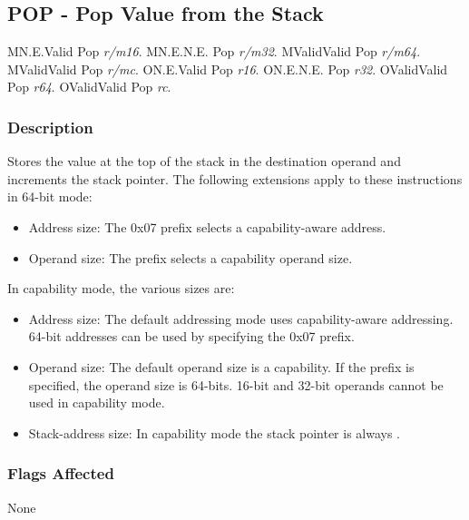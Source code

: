 \clearpage
{}
{}
\subsection*{POP - Pop Value from the Stack}

\begin{x86opcodetable}
  {M}{N.E.}{Valid}
  {Pop \emph{r/m16}.}
  {M}{N.E.}{N.E.}
  {Pop \emph{r/m32}.}
  {M}{Valid}{Valid}
  {Pop \emph{r/m64}.}
  {M}{Valid}{Valid}
  {Pop \emph{r/mc}.}
  {O}{N.E.}{Valid}
  {Pop \emph{r16}.}
  {O}{N.E.}{N.E.}
  {Pop \emph{r32}.}
  {O}{Valid}{Valid}
  {Pop \emph{r64}.}
  {O}{Valid}{Valid}
  {Pop \emph{rc}.}
\end{x86opcodetable}

\begin{x86opentable}
\end{x86opentable}

\subsubsection*{Description}

Stores the value at the top of the stack in the destination operand
and increments the stack pointer.  The following extensions apply to
these instructions in 64-bit mode:

\begin{itemize}
  \item Address size: The 0x07 prefix selects a capability-aware
    address.

  \item Operand size: The  prefix selects a capability
    operand size.
\end{itemize}

In capability mode, the various sizes are:

\begin{itemize}
  \item Address size: The default addressing mode uses
    capability-aware addressing.  64-bit addresses can be used by
    specifying the 0x07 prefix.

  \item Operand size: The default operand size is a capability.  If
    the  prefix is specified, the operand size is
    64-bits.  16-bit and 32-bit operands cannot be used in capability
    mode.

  \item Stack-address size: In capability mode the stack pointer is
    always \CSP{}.
\end{itemize}

\subsubsection*{Flags Affected}

None
